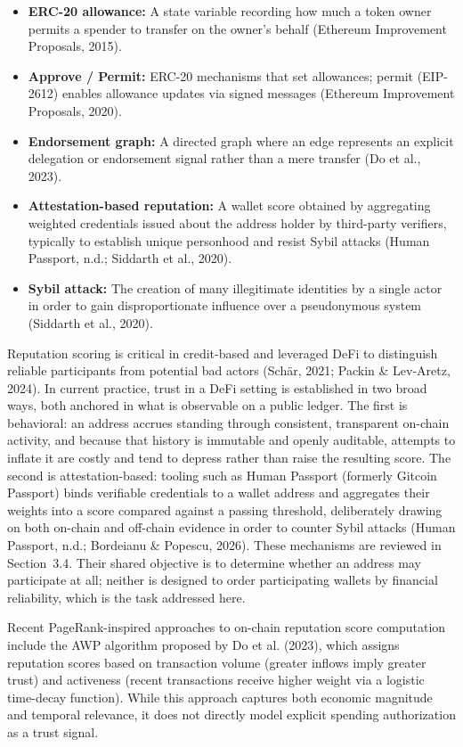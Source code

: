 \begin{itemize}
\item[\textbullet] \textbf{ERC-20 allowance: }A state variable recording how much a token owner permits a spender to transfer on the owner's behalf (Ethereum Improvement Proposals, 2015).
\item[\textbullet] \textbf{Approve / Permit: }ERC-20 mechanisms that set allowances; permit (EIP-2612) enables allowance updates via signed messages (Ethereum Improvement Proposals, 2020).
\item[\textbullet] \textbf{Endorsement graph: }A directed graph where an edge represents an explicit delegation or endorsement signal rather than a mere transfer (Do et al., 2023).
\item[\textbullet] \textbf{Attestation-based reputation: }A wallet score obtained by aggregating weighted credentials issued about the address holder by third-party verifiers, typically to establish unique personhood and resist Sybil attacks (Human Passport, n.d.; Siddarth et al., 2020).
\item[\textbullet] \textbf{Sybil attack: }The creation of many illegitimate identities by a single actor in order to gain disproportionate influence over a pseudonymous system (Siddarth et al., 2020).
\end{itemize}
Reputation scoring is critical in credit-based and leveraged DeFi to distinguish reliable participants from potential bad actors (Sch\"{a}r, 2021; Packin \& Lev-Aretz, 2024). In current practice, trust in a DeFi setting is established in two broad ways, both anchored in what is observable on a public ledger. The first is behavioral: an address accrues standing through consistent, transparent on-chain activity, and because that history is immutable and openly auditable, attempts to inflate it are costly and tend to depress rather than raise the resulting score. The second is attestation-based: tooling such as Human Passport (formerly Gitcoin Passport) binds verifiable credentials to a wallet address and aggregates their weights into a score compared against a passing threshold, deliberately drawing on both on-chain and off-chain evidence in order to counter Sybil attacks (Human Passport, n.d.; Bordeianu \& Popescu, 2026). These mechanisms are reviewed in Section~3.4. Their shared objective is to determine whether an address may participate at all; neither is designed to order participating wallets by financial reliability, which is the task addressed here.


Recent PageRank-inspired approaches to on-chain reputation score computation include the AWP algorithm proposed by Do et al. (2023), which assigns reputation scores based on transaction volume (greater inflows imply greater trust) and activeness (recent transactions receive higher weight via a logistic time-decay function). While this approach captures both economic magnitude and temporal relevance, it does not directly model explicit spending authorization as a trust signal.



